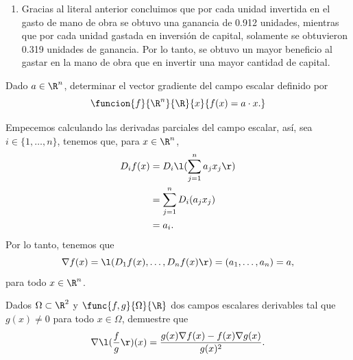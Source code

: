 \documentclass[a4,11pt]{aleph-examen}
\begin{document}
\begin{preguntas}
\begin{respuesta}
\begin{respuesta}
\begin{respuesta}
\begin{enumerate}
        Para 1920 tenemos que,
        \[
            D_1 p (194, 407) \approx 0.912 \texty D_2 p (194, 407) \approx 0.319.
        \]
        Para 1920 tenemos que,
        \[
            D_1 p (100, 100) \approx 0.758 \texty D_2 p (100, 100) \approx 0.555.
        \]
        Como podemos notar, comparando los valores marginales obtenidos para cada año concluimos que respecto a la mano de obra, fue mas rentable invertir en este rubro en el año 1920 que en el año 1899. De forma similar, se concluye que respecto al capital, fue más rentable invertir en este rubro en 1899 que en 1920. 
        \item 
        Gracias al literal anterior concluimos que por cada unidad invertida en el gasto de mano de obra se obtuvo una ganancia de 0.912 unidades, mientras que por cada unidad gastada en inversión de capital, solamente se obtuvieron 0.319 unidades de ganancia. Por lo tanto, se obtuvo un mayor beneficio al gastar en la mano de obra que en invertir una mayor cantidad de capital.
    \end{enumerate}
\end{respuesta}

\item 
    Dado $a\in\R^n$, determinar el vector gradiente del campo escalar definido por
    \[
        \funcion{f}{\R^n}{\R}{x}{f(x)=a\cdot x.}
    \]

\begin{respuesta}
    Empecemos calculando las derivadas parciales del campo escalar, así, sea $i\in\{1,\ldots,n\}$, tenemos que, para $x\in\R^n$,
    \begin{align*}
        D_if(x) 
            & = D_i \l( \sum_{j=1}^n a_jx_j \r)\\
            & = \sum_{j=1}^n D_i (a_jx_j)\\
            & = a_i.
    \end{align*}
    Por lo tanto, tenemos que
    \[
        \nabla f(x)
        =\l(D_1f(x), \ldots, D_nf(x)\r)
        =(a_1,\ldots,a_n) = a,
    \]
    para todo $x\in \R^n$.
\end{respuesta}

\item 
    Dados $\Omega\subset \R^2$ y $\func{f,g}{\Omega}{\R}$ dos campos escalares derivables tal que $g(x)\neq 0$ para todo $x\in \Omega$, demuestre que
    \[
        \nabla\l(\frac{f}{g}\r)(x)=\frac{g(x)\nabla f(x)-f(x)\nabla g(x)}{g(x)^2}.
    \]


\end{respuesta}
\end{respuesta}
\end{preguntas}
\end{document}
